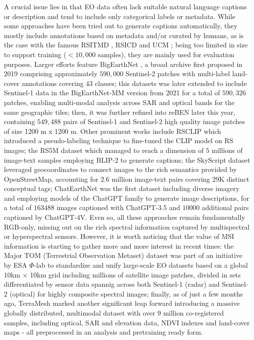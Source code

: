 \documentclass[a4paper, oneside, english]{sapthesis} %
\begin{document}
A crucial issue lies in that EO data often lack suitable natural language captions or description and tend to include only categorical labels or metadata. While some approaches have been tried out to generate captions automatically, they mostly include annotations based on metadata and/or curated by humans, as is the case with the famous RSITMD \cite{yuan2022exploring}, RSICD \cite{lu2017exploring} and UCM \cite{yang2010bag}; being too limited in size to support training ($< 10,000$ samples), they are mainly used for evaluation purposes. Larger efforts feature BigEarthNet \cite{sumbul2019bigearthnet}, a broad archive first proposed in 2019 comprising approximately $590,000$ Sentinel‑2 patches with multi-label land-cover annotations covering 43 classes; this datasets was later extended to include Sentinel‑1 data in the BigEarthNet‑MM version from 2021 \cite{sumbul2021bignearthnetmm} for a total of $590,326$ patches, enabling multi-modal analysis across SAR and optical bands for the same geographic tiles; then, it was further refined into reBEN \cite{clasen2024reben} later this year, containing $549,488$ pairs of Sentinel-1 and Sentinel-2 high quality image patches of size 1200 m x 1200 m. Other prominent works include RSCLIP \cite{li2023rs} which introduced a pseudo-labeling technique to fine-tuned the CLIP model on RS images; the RS5M dataset \cite{zhang2024rs5m} which managed to reach a dimension of $5$ millions of image-text samples employing BLIP-2 \cite{li2023blip} to generate captions; the SkyScript dataset \cite{wang2024skyscript} leveraged geocoordinates to connect images to the rich semantics provided by OpenStreetMap, accounting for $2.6$ million image-text pairs covering 29K distinct conceptual tags; ChatEarthNet \cite{yuan2024chatearthnet} was the first dataset including diverse imagery and employing models of the ChatGPT family to generate image descriptions, for a total of $163488$ images captioned with ChatGPT-3.5 and $10000$ additional pairs captioned by ChatGPT-4V. Even so, all these approaches remain fundamentally RGB-only, missing out on the rich spectral information captured by multispectral or hyperspectral sensors. However, it is worth noticing that the value of MSI information is starting to gather more and more interest in recent times: the Major TOM (Terrestrial Observation Metaset) dataset \cite{francis2024major} was part of an initiative by ESA $\Phi$-lab to standardize and unify large-scale EO datasets based on a global 10km $\times$ 10km grid including millions of satellite image patches, divided in sets differentiated by sensor data spannig across both Sentinel-1 (radar) and Sentinel-2 (optical) for highly composite spectral images; finally, as of just a few months ago, TerraMesh \cite{blumenstiel2025terramesh} marked another significant leap forward introducing a massive globally distributed, multimodal dataset with over $9$ million co-registered samples, including optical, SAR and elevation data, NDVI indexes and land-cover maps - all preprocessed in an analysis and pretraining ready form.
\end{document}
